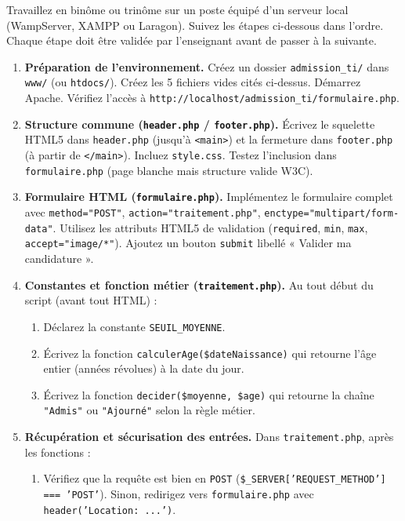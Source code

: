 \documentclass[11pt]{article}
\newcounter{popsec}
\newcounter{popsub}
\newcommand{\courssub}[1]{%
  \stepcounter{popsub}%
  \par\vspace{9pt}\noindent{\popxbold\fontsize{11.5}{13}\selectfont\color{popink}{\color{poporange}\thepopsec.\thepopsub}\hspace{6pt}#1}\par\nopagebreak\vspace{4pt}
}
\begin{document}
\courssub{Consignes}
Travaillez en binôme ou trinôme sur un poste équipé d'un serveur local (WampServer, XAMPP ou Laragon). Suivez les étapes ci-dessous dans l'ordre. Chaque étape doit être validée par l'enseignant avant de passer à la suivante.

\begin{enumerate}
    \item \textbf{Préparation de l'environnement.} Créez un dossier \texttt{admission\_ti/} dans \texttt{www/} (ou \texttt{htdocs/}). Créez les 5 fichiers vides cités ci-dessus. Démarrez Apache. Vérifiez l'accès à \texttt{http://localhost/admission\_ti/formulaire.php}.
    \item \textbf{Structure commune (\texttt{header.php} / \texttt{footer.php}).} Écrivez le squelette HTML5 dans \texttt{header.php} (jusqu'à \texttt{<main>}) et la fermeture dans \texttt{footer.php} (à partir de \texttt{</main>}). Incluez \texttt{style.css}. Testez l'inclusion dans \texttt{formulaire.php} (page blanche mais structure valide W3C).
    \item \textbf{Formulaire HTML (\texttt{formulaire.php}).} Implémentez le formulaire complet avec \texttt{method="POST"}, \texttt{action="traitement.php"}, \texttt{enctype="multipart/form-data"}. Utilisez les attributs HTML5 de validation (\texttt{required}, \texttt{min}, \texttt{max}, \texttt{accept="image/*"}). Ajoutez un bouton \texttt{submit} libellé « Valider ma candidature ».
    \item \textbf{Constantes et fonction métier (\texttt{traitement.php}).} Au tout début du script (avant tout HTML) :
    \begin{enumerate}
        \item Déclarez la constante \texttt{SEUIL\_MOYENNE}.
        \item Écrivez la fonction \texttt{calculerAge(\$dateNaissance)} qui retourne l'âge entier (années révolues) à la date du jour.
        \item Écrivez la fonction \texttt{decider(\$moyenne, \$age)} qui retourne la chaîne \texttt{"Admis"} ou \texttt{"Ajourné"} selon la règle métier.
    \end{enumerate}
    \item \textbf{Récupération et sécurisation des entrées.} Dans \texttt{traitement.php}, après les fonctions :
    \begin{enumerate}
        \item Vérifiez que la requête est bien en \texttt{POST} (\texttt{\$\_SERVER['REQUEST\_METHOD'] === 'POST'}). Sinon, redirigez vers \texttt{formulaire.php} avec \texttt{header('Location: ...')}.

\end{enumerate}
\end{enumerate}
\end{document}
